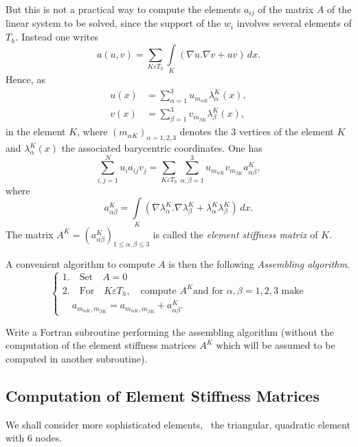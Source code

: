 But this is not a practical way to compute the elements $a_{ij}$ of
the matrix $A$ of the linear system to be solved, since the support of
the $w_i$ involves several elements of $T_h$. Instead one writes
$$
a(u, v)=\sum\limits_{K\varepsilon T_h}\int\limits_K(\nabla u.\nabla
v+uv)\,dx.
$$
Hence, as 
\begin{align*}
u(x) &= \sum\limits_{\alpha =1}^3 u_{m_{\alpha
K}}\lambda_\alpha^K(x),\\
v(x) &= \sum\limits_{\beta =1}^3v_{m_{\beta K}}\lambda_\beta^K(x),
\end{align*}
in the element $K$, where $(m_{\alpha K})_{\alpha =1, 2, 3}$ denotes
the 3 vertices of the element $K$ and $\lambda_\alpha^K(x)$ the
associated barycentric coordinates. One has 
$$
\sum\limits_{i, j=1}^Nu_ia_{ij}v_j=\sum\limits_{K\varepsilon T_h}
\sum\limits_{\alpha,\beta =1}^3u_{m_{\alpha K}}v_{m_{\beta K}}
a_{\alpha\beta}^K, 
$$\pageoriginale
where
$$
a_{\alpha\beta}^K=\int\limits_K(\nabla\lambda_\alpha^K.\nabla\lambda_\beta^K
+\lambda_\alpha^K\lambda_\beta^K)\,dx.
$$
The matrix $A^K=(a_{\alpha\beta}^K)_{1\leq\alpha,\beta\leq 3}$ is
called the \emph{element stiffness matrix} of $K$.

A convenient algorithm to compute $A$ is then the following
\emph{Assembling algorithm}.
\begin{equation*} 
\begin{cases}
1.\quad\text{Set}\quad A=0\\
2.\quad\text{For}\quad K\varepsilon T_h,\quad\text{compute $A^K$
and for $\alpha,\beta=1, 2, 3$ make}\\
\quad a_{m_{\alpha K},m_{\beta 
K}}= a_{m_{\alpha K},m_{\beta K}}+a_{\alpha\beta}^K.
\end{cases}
\end{equation*}

\begin{exercise}\label{chap4:exr3}
Write a Fortran subroutine performing the assembling algorithm
(without the computation of the element stiffness matrices $A^K$ which
will be assumed to be computed in another subroutine).
\end{exercise}

\subsection{Computation of Element Stiffness Matrices} \label{chap4:sec3}
We shall consider more sophisticated 
elements, \eg\ the triangular, qua\-dra\-tic element with 6 nodes.

